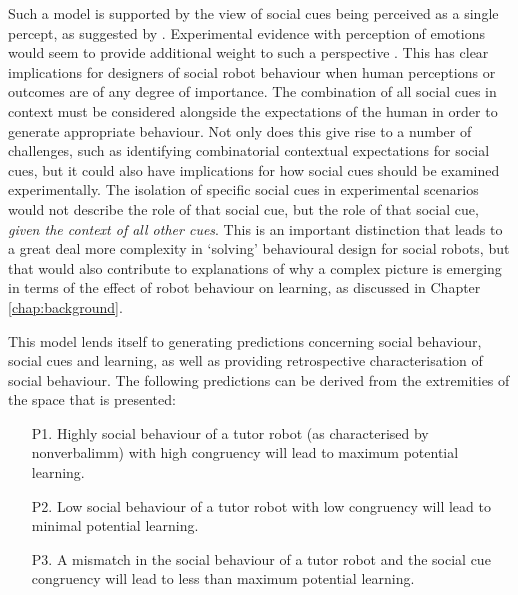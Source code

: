 Such a model is supported by the view of social cues being perceived as a single percept, as suggested by \cite{zaki2013cue}. Experimental evidence with perception of emotions would seem to provide additional weight to such a perspective \citep{nook2015new}. This has clear implications for designers of social robot behaviour when human perceptions or outcomes are of any degree of importance. The combination of all social cues in context must be considered alongside the expectations of the human in order to generate appropriate behaviour. Not only does this give rise to a number of challenges, such as identifying combinatorial contextual expectations for social cues, but it could also have implications for how social cues should be examined experimentally. The isolation of specific social cues in experimental scenarios would not describe the role of that social cue, but the role of that social cue, \textit{given the context of all other cues}. This is an important distinction that leads to a great deal more complexity in `solving' behavioural design for social robots, but that would also contribute to explanations of why a complex picture is emerging in terms of the effect of robot behaviour on \gls{learning}, as discussed in Chapter \ref{chap:background}.

This model lends itself to generating predictions concerning social behaviour, social cues and \gls{learning}, as well as providing retrospective characterisation of social behaviour. The following predictions can be derived from the extremities of the space that is presented:
\begin{enumerate}
	\item [P1.] Highly social behaviour of a tutor robot (as characterised by \gls{nonverbalimm}) with high congruency will lead to maximum potential \gls{learning}.
	\item [P2.] Low social behaviour of a tutor robot with low congruency will lead to minimal potential \gls{learning}.
	\item [P3.] A mismatch in the social behaviour of a tutor robot and the social cue congruency will lead to less than maximum potential \gls{learning}.
\end{enumerate}

